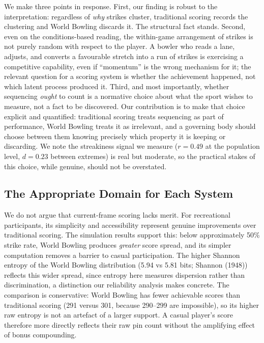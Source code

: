 \documentclass[
  letterpaper,
  DIV=11,
  numbers=noendperiod]{scrartcl}
\begin{document}
We make three points in response. First, our finding is robust to the
interpretation: regardless of \emph{why} strikes cluster, traditional
scoring records the clustering and World Bowling discards it. The
structural fact stands. Second, even on the conditions-based reading,
the within-game arrangement of strikes is not purely random with respect
to the player. A bowler who reads a lane, adjusts, and converts a
favourable stretch into a run of strikes is exercising a competitive
capability, even if ``momentum'' is the wrong mechanism for it; the
relevant question for a scoring system is whether the achievement
happened, not which latent process produced it. Third, and most
importantly, whether sequencing \emph{ought} to count is a normative
choice about what the sport wishes to measure, not a fact to be
discovered. Our contribution is to make that choice explicit and
quantified: traditional scoring treats sequencing as part of
performance, World Bowling treats it as irrelevant, and a governing body
should choose between them knowing precisely which property it is
keeping or discarding. We note the streakiness signal we measure
(\(r = 0.49\) at the population level, \(d = 0.23\) between extremes) is
real but moderate, so the practical stakes of this choice, while
genuine, should not be overstated.

\subsection{The Appropriate Domain for Each
System}\label{the-appropriate-domain-for-each-system}

We do not argue that current-frame scoring lacks merit. For recreational
participants, its simplicity and accessibility represent genuine
improvements over traditional scoring. The simulation results support
this: below approximately 50\% strike rate, World Bowling produces
\emph{greater} score spread, and its simpler computation removes a
barrier to casual participation. The higher Shannon entropy of the World
Bowling distribution (5.94 vs 5.81 bits; Shannon (1948)) reflects this
wider spread, since entropy here measures dispersion rather than
discrimination, a distinction our reliability analysis makes concrete.
The comparison is conservative: World Bowling has fewer achievable
scores than traditional scoring (291 versus 301, because 290--299 are
impossible), so its higher raw entropy is not an artefact of a larger
support. A casual player's score therefore more directly reflects their
raw pin count without the amplifying effect of bonus compounding.
\end{document}
